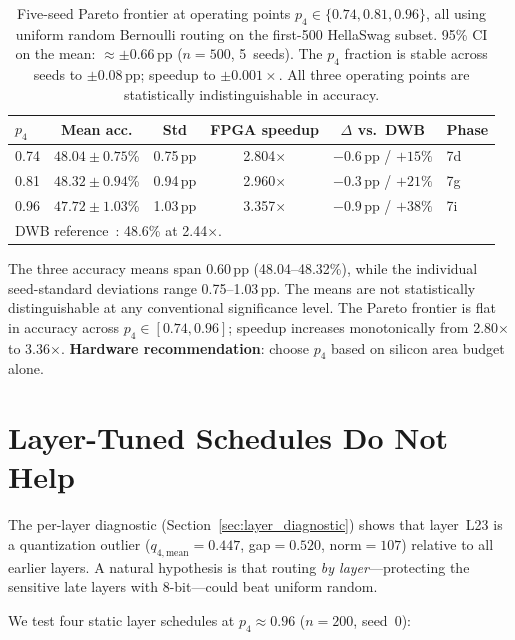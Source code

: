 \documentclass{article}
\begin{document}
\begin{table}[h]
\centering
\caption{Five-seed Pareto frontier at operating points $p_4 \in \{0.74, 0.81, 0.96\}$,
all using uniform random Bernoulli routing on the first-500 HellaSwag subset.
95\% CI on the mean: $\approx\pm0.66$\,pp ($n{=}500$, 5~seeds).
The $p_4$ fraction is stable across seeds to $\pm0.08$\,pp; speedup to $\pm0.001\times$.
All three operating points are statistically indistinguishable in accuracy.}
\begin{tabular}{lccccl}
\toprule
$p_4$ & Mean acc. & Std & FPGA speedup & $\Delta$ vs.\ DWB & Phase \\
\midrule
0.74 & $48.04\pm0.75$\% & 0.75\,pp & 2.804$\times$ & $-0.6$\,pp / $+15\%$ & 7d \\
0.81 & $48.32\pm0.94$\% & 0.94\,pp & 2.960$\times$ & $-0.3$\,pp / $+21\%$ & 7g \\
0.96 & $47.72\pm1.03$\% & 1.03\,pp & 3.357$\times$ & $-0.9$\,pp / $+38\%$ & 7i \\
\midrule
\multicolumn{6}{l}{\small DWB reference~\citep{haeri2026dwb}: 48.6\% at 2.44$\times$.} \\
\bottomrule
\end{tabular}
\label{tab:fiveseed}
\end{table}

The three accuracy means span 0.60\,pp (48.04--48.32\%), while the individual seed-standard
deviations range 0.75--1.03\,pp. The means are not statistically distinguishable at any
conventional significance level. The Pareto frontier is flat in accuracy across
$p_4\in[0.74,0.96]$; speedup increases monotonically from 2.80$\times$ to 3.36$\times$.
\textbf{Hardware recommendation}: choose $p_4$ based on silicon area budget alone.

\section{Layer-Tuned Schedules Do Not Help}
\label{sec:layer_schedules}

The per-layer diagnostic (Section~\ref{sec:layer_diagnostic}) shows that layer~L23 is
a quantization outlier ($q_{4,\text{mean}}{=}0.447$, gap$=0.520$, norm$=107$) relative
to all earlier layers. A natural hypothesis is that routing \emph{by layer}---protecting
the sensitive late layers with 8-bit---could beat uniform random.

We test four static layer schedules at $p_4\approx0.96$ ($n{=}200$, seed~0):
\end{document}
